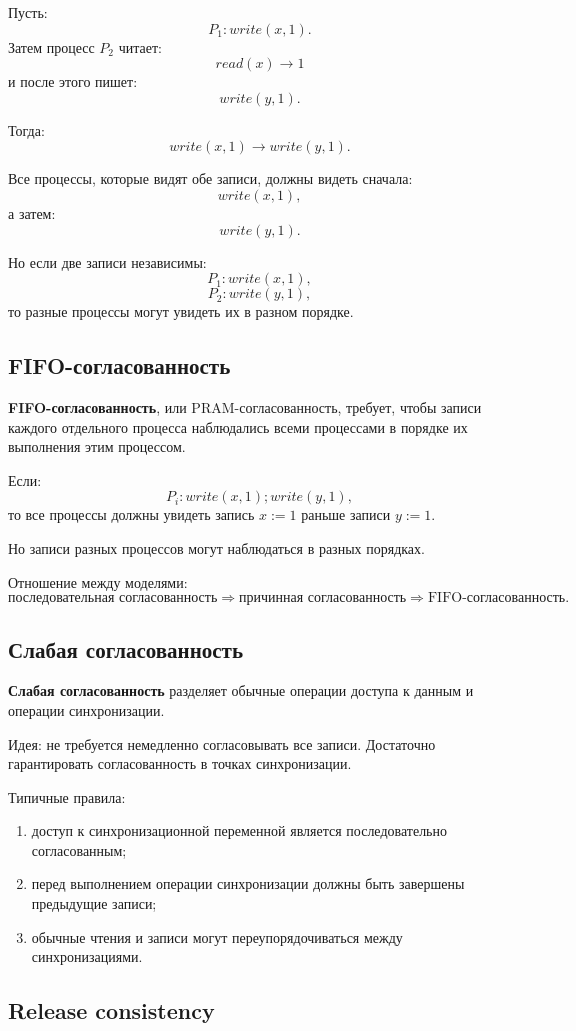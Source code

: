 \documentclass[12pt,a4paper]{article}
\begin{document}
Пусть:
\[
P_1: write(x,1).
\]
Затем процесс $P_2$ читает:
\[
read(x) \rightarrow 1
\]
и после этого пишет:
\[
write(y,1).
\]

Тогда:
\[
write(x,1) \rightarrow write(y,1).
\]

Все процессы, которые видят обе записи, должны видеть сначала:
\[
write(x,1),
\]
а затем:
\[
write(y,1).
\]

Но если две записи независимы:
\[
P_1: write(x,1),
\]
\[
P_2: write(y,1),
\]
то разные процессы могут увидеть их в разном порядке.

\subsection{FIFO-согласованность}

\textbf{FIFO-согласованность}, или PRAM-согласованность, требует, чтобы записи каждого отдельного процесса наблюдались всеми процессами в порядке их выполнения этим процессом.

Если:
\[
P_i: write(x,1); write(y,1),
\]
то все процессы должны увидеть запись $x:=1$ раньше записи $y:=1$.

Но записи разных процессов могут наблюдаться в разных порядках.

Отношение между моделями:
\[
\text{последовательная согласованность}
\Rightarrow
\text{причинная согласованность}
\Rightarrow
\text{FIFO-согласованность}.
\]

\subsection{Слабая согласованность}

\textbf{Слабая согласованность} разделяет обычные операции доступа к данным и операции синхронизации.

Идея: не требуется немедленно согласовывать все записи. Достаточно гарантировать согласованность в точках синхронизации.

Типичные правила:
\begin{enumerate}
    \item доступ к синхронизационной переменной является последовательно согласованным;
    \item перед выполнением операции синхронизации должны быть завершены предыдущие записи;
    \item обычные чтения и записи могут переупорядочиваться между синхронизациями.
\end{enumerate}

\subsection{Release consistency}
\end{document}
